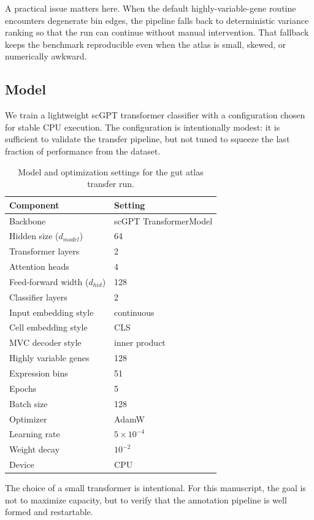 \documentclass[11pt]{article}
\begin{document}
A practical issue matters here.
When the default highly-variable-gene routine encounters degenerate bin edges, the pipeline falls back to deterministic variance ranking so that the run can continue without manual intervention.
That fallback keeps the benchmark reproducible even when the atlas is small, skewed, or numerically awkward.

\subsection{Model}
We train a lightweight scGPT transformer classifier with a configuration chosen for stable CPU execution.
The configuration is intentionally modest: it is sufficient to validate the transfer pipeline, but not tuned to squeeze the last fraction of performance from the dataset.

\begin{table}[H]
\centering
\caption{Model and optimization settings for the gut atlas transfer run.}
\begin{tabular}{ll}
\toprule
Component & Setting \\
\midrule
Backbone & scGPT TransformerModel \\
Hidden size ($d_{model}$) & 64 \\
Transformer layers & 2 \\
Attention heads & 4 \\
Feed-forward width ($d_{hid}$) & 128 \\
Classifier layers & 2 \\
Input embedding style & continuous \\
Cell embedding style & CLS \\
MVC decoder style & inner product \\
Highly variable genes & 128 \\
Expression bins & 51 \\
Epochs & 5 \\
Batch size & 128 \\
Optimizer & AdamW \\
Learning rate & $5\times10^{-4}$ \\
Weight decay & $10^{-2}$ \\
Device & CPU \\
\bottomrule
\end{tabular}
\end{table}

The choice of a small transformer is intentional.
For this manuscript, the goal is not to maximize capacity, but to verify that the annotation pipeline is well formed and restartable.
\end{document}
